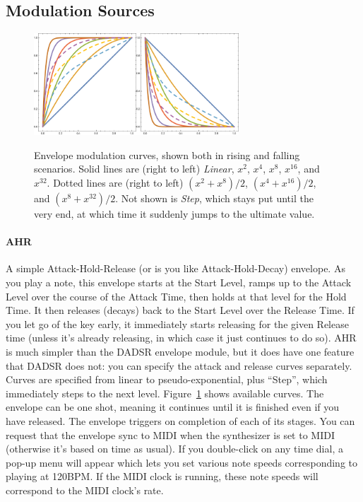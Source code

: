 \documentclass{article}
\begin{document}
\subsection{Modulation Sources}
\label{modsources}

\begin{figure}
\vspace{-1em}
\includegraphics[height=1.5in]{CurveUp}\includegraphics[height=1.5in]{CurveDown}
\caption{Envelope modulation curves, shown both in rising and falling scenarios.  Solid lines are (right to left) {\it Linear}, \(x^2\), \(x^4\), \(x^8\), \(x^{16}\), and \(x^{32}\).  Dotted lines are (right to left) \((x^2 + x^8)/2\),  \((x^4 + x^{16})/2\), and  \((x^8 + x^{32})/2\).  Not shown is {\it Step}, which stays put until the very end, at which time it suddenly jumps to the ultimate value. }
\label{curves}
\end{figure}

\paragraph{AHR}  A simple Attack-Hold-Release (or is you like Attack-Hold-Decay) envelope.  As you play a note, this envelope starts at the Start Level, ramps up to the Attack Level over the course of the Attack Time, then holds at that level for the Hold Time.  It then releases (decays) back to the Start Level over the Release Time.  If you let go of the key early, it immediately starts releasing for the given Release time (unless it's already releasing, in which case it just continues to do so).  AHR is much simpler than the DADSR envelope module, but it does have one feature that DADSR does not: you can specify the attack and release curves separately.  Curves are specified from linear to pseudo-exponential, plus ``Step'', which immediately steps to the next level.  Figure~\ref{curves} shows available curves.  The envelope can be one shot, meaning it continues until it is finished even if you have released.   The envelope triggers on completion of each of its stages.  You can request that the envelope sync to MIDI when the synthesizer is set to MIDI (otherwise it's based on time as usual).  If you double-click on any time dial, a pop-up menu will appear which lets you set various note speeds corresponding to playing at 120BPM.  If the MIDI clock is running, these note speeds will correspond to the MIDI clock's rate.
\end{document}
